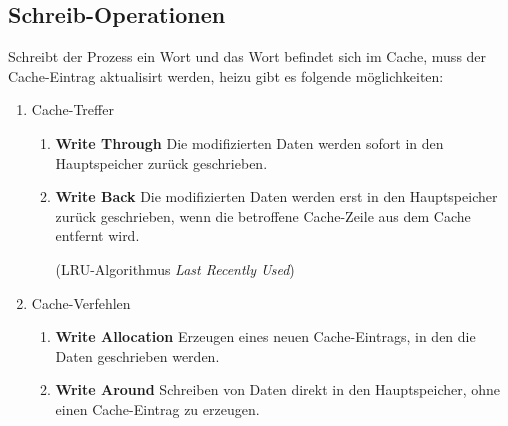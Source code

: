 \subsection{Schreib-Operationen}
Schreibt der Prozess ein Wort und das Wort befindet sich im Cache, muss der Cache-Eintrag aktualisirt 
werden, heizu gibt es folgende möglichkeiten:
\begin{enumerate}
 \item Cache-Treffer
 \begin{enumerate}
  \item\textbf{Write Through} Die modifizierten Daten werden sofort in den Hauptspeicher zurück geschrieben.
  \item\textbf{Write Back} Die modifizierten Daten werden erst in den Hauptspeicher zurück geschrieben,
  wenn die betroffene Cache-Zeile aus dem Cache entfernt wird.\par (LRU-Algorithmus \emph{Last Recently Used})
 \end{enumerate}

 \item Cache-Verfehlen
 \begin{enumerate}
  \item\textbf{Write Allocation} Erzeugen eines neuen Cache-Eintrags, in den die Daten geschrieben werden.
  \item\textbf{Write Around} Schreiben von Daten direkt in den Hauptspeicher, ohne einen Cache-Eintrag 
  zu erzeugen.
 \end{enumerate}
\end{enumerate}

